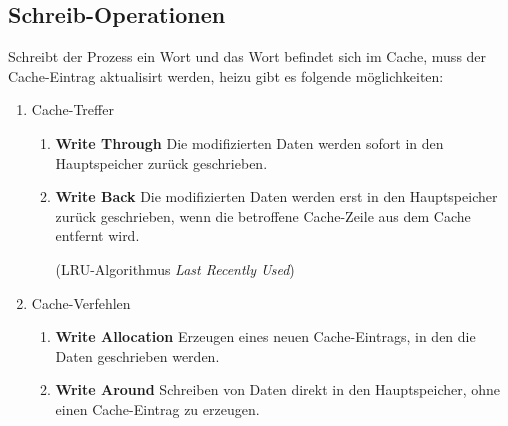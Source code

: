 \subsection{Schreib-Operationen}
Schreibt der Prozess ein Wort und das Wort befindet sich im Cache, muss der Cache-Eintrag aktualisirt 
werden, heizu gibt es folgende möglichkeiten:
\begin{enumerate}
 \item Cache-Treffer
 \begin{enumerate}
  \item\textbf{Write Through} Die modifizierten Daten werden sofort in den Hauptspeicher zurück geschrieben.
  \item\textbf{Write Back} Die modifizierten Daten werden erst in den Hauptspeicher zurück geschrieben,
  wenn die betroffene Cache-Zeile aus dem Cache entfernt wird.\par (LRU-Algorithmus \emph{Last Recently Used})
 \end{enumerate}

 \item Cache-Verfehlen
 \begin{enumerate}
  \item\textbf{Write Allocation} Erzeugen eines neuen Cache-Eintrags, in den die Daten geschrieben werden.
  \item\textbf{Write Around} Schreiben von Daten direkt in den Hauptspeicher, ohne einen Cache-Eintrag 
  zu erzeugen.
 \end{enumerate}
\end{enumerate}

